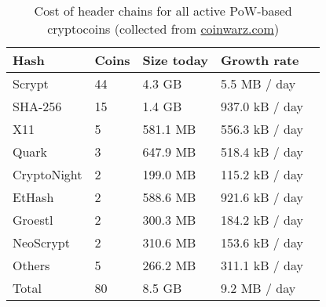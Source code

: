\begin{table}
  \caption{Cost of header chains for all active PoW-based cryptocoins
           (collected from \url{coinwarz.com})}
  \vspace{-1em}
  \label{tbl.currencies}
  \small
  \centering
  \begin{tabular}{l@{}|l|l|l@{}}
    {\bf Hash} & {\bf Coins} & {\bf Size today} & {\bf Growth rate}  \\
    \hline
    Scrypt  & 44  & 4.3 GB  & 5.5 MB / day \  \\
    SHA-256  & 15  & 1.4 GB  & 937.0 kB / day \  \\
    X11  & 5  & 581.1 MB  & 556.3 kB / day \  \\
    Quark  & 3  & 647.9 MB  & 518.4 kB / day \  \\
    CryptoNight  & 2  & 199.0 MB  & 115.2 kB / day \  \\
    EtHash  & 2  & 588.6 MB  & 921.6 kB / day \  \\
    Groestl  & 2  & 300.3 MB  & 184.2 kB / day \  \\
    NeoScrypt  & 2  & 310.6 MB  & 153.6 kB / day \  \\
    Others  & 5  & 266.2 MB  & 311.1 kB / day \  \\
    \hline
    Total  & 80   &  8.5 GB  & 9.2 MB  / day  \\
  \end{tabular}
\vspace{-1em}
\end{table}

